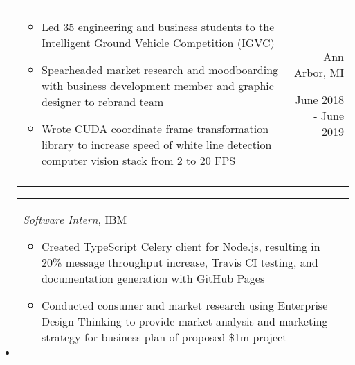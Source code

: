 \documentclass[9pt]{memoir}
\begin{document}
\begin{itemize}
\begin{tabular}[t]{lr}
\begin{minipage}[t]{0.7 \textwidth}
\small

\begin{itemize}
    \item Led 35 engineering and business students to the Intelligent Ground
          Vehicle Competition (IGVC)
    \item Spearheaded market research and moodboarding with business development
          member and graphic designer to rebrand team
    \item Wrote CUDA coordinate frame transformation library to increase speed
          of white line detection computer vision stack from 2 to 20 FPS
\end{itemize}

\end{minipage}

&

\begin{minipage}[t]{0.2 \textwidth}
\raggedleft

\normalsize
Ann Arbor, MI

\small
June 2018 - June 2019
\end{minipage}

\\ \\

\end{tabular}

\item

\begin{tabular}[t]{lr}

\begin{minipage}[t]{0.7 \textwidth}
\raggedright

\normalsize
\textit{Software Intern}, IBM

\small

\begin{itemize}
\item Created TypeScript Celery client for Node.js, resulting in 20\%
      message throughput increase, Travis CI testing, and documentation
      generation with GitHub Pages
\item Conducted consumer and market research using Enterprise Design Thinking to
      provide market analysis and marketing strategy for business plan of
      proposed \$1m project
\end{itemize}

\end{minipage}

&

\begin{minipage}[t]{0.2 \textwidth}
\raggedleft


\end{minipage}
\end{tabular}
\end{itemize}
\end{document}
